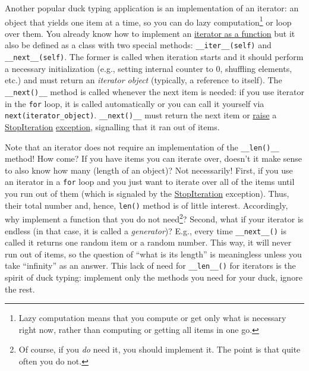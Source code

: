\documentclass[
]{book}
\begin{document}
Another popular duck typing application is an implementation of an iterator: an object that yields one item at a time, so you can do lazy computation\footnote{Lazy computation means that you compute or get only what is necessary right now, rather than computing or getting all items in one go.} or loop over them. You already know how to implement an \protect\hyperlink{iteratorgenerator-functions}{iterator as a function} but it also be defined as a class with two special methods: \texttt{\_\_iter\_\_(self)} and \texttt{\_\_next\_\_(self)}. The former is called when iteration starts and it should perform a necessary initialization (e.g., setting internal counter to 0, shuffling elements, etc.) and must return an \emph{iterator object} (typically, a reference to itself). The \texttt{\_\_next()\_\_} method is called whenever the next item is needed: if you use iterator in the \texttt{for} loop, it is called automatically or you can call it yourself via \texttt{next(iterator\_object)}. \texttt{\_\_next()\_\_} must return the next item or \href{https://docs.python.org/3/reference/simple_stmts.html\#the-raise-statement}{raise} a \href{https://docs.python.org/3/library/exceptions.html\#StopIteration}{StopIteration} \protect\hyperlink{exceptions}{exception}, signalling that it ran out of items.

Note that an iterator does not require an implementation of the \texttt{\_\_len()\_\_} method! How come? If you have items you can iterate over, doesn't it make sense to also know how many (length of an object)? Not necessarily! First, if you use an iterator in a \texttt{for} loop and you just want to iterate over all of the items until you run out of them (which is signaled by the \href{https://docs.python.org/3/library/exceptions.html\#StopIteration}{StopIteration} exception). Thus, their total number and, hence, \texttt{len()} method is of little interest. Accordingly, why implement a function that you do not need\footnote{Of course, if you \emph{do} need it, you should implement it. The point is that quite often you do not.}? Second, what if your iterator is endless (in that case, it is called a \emph{generator})? E.g., every time \texttt{\_\_next\_\_()} is called it returns one random item or a random number. This way, it will never run out of items, so the question of ``what is its length'' is meaningless unless you take ``infinity'' as an answer. This lack of need for \texttt{\_\_len\_\_()} for iterators is the spirit of duck typing: implement only the methods you need for your duck, ignore the rest.
\end{document}
